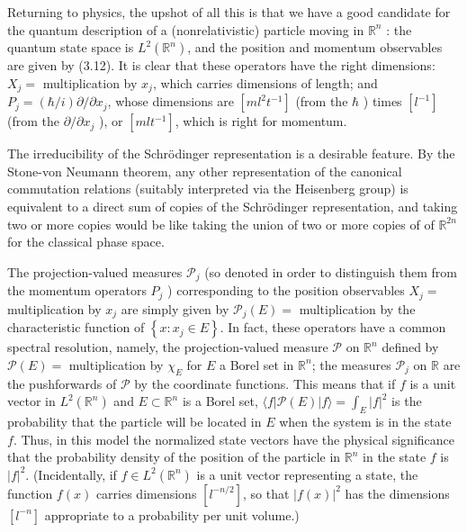 \documentclass[10pt, letterpaper]{article}
\begin{document}
Returning to physics, the upshot of all this is that we have a good candidate for the quantum description of a (nonrelativistic) particle moving in $\mathbb{R}^{n}$ : the quantum state space is $L^{2}\left(\mathbb{R}^{n}\right)$, and the position and momentum observables are given by (3.12). It is clear that these operators have the right dimensions: $X_{j}=$ multiplication by $x_{j}$, which carries dimensions of length; and $P_{j}=(\hbar / i) \partial / \partial x_{j}$, whose dimensions are $\left[m l^{2} t^{-1}\right]$ (from the $\hbar$ ) times $\left[l^{-1}\right]$ (from the $\partial / \partial x_{j}$ ), or $\left[m l t^{-1}\right]$, which is right for momentum.

The irreducibility of the Schrödinger representation is a desirable feature. By the Stone-von Neumann theorem, any other representation of the canonical commutation relations (suitably interpreted via the Heisenberg group) is equivalent to a direct sum of copies of the Schrödinger representation, and taking two or more copies would be like taking the union of two or more copies of of $\mathbb{R}^{2 n}$ for the classical phase space.

The projection-valued measures $\mathcal{P}_{j}$ (so denoted in order to distinguish them from the momentum operators $P_{j}$ ) corresponding to the position observables $X_{j} =$ multiplication by $x_{j}$ are simply given by $\mathcal{P}_{j}(E)=$ multiplication by the characteristic function of $\left\{x: x_{j} \in E\right\}$. In fact, these operators have a common spectral resolution, namely, the projection-valued measure $\mathcal{P}$ on $\mathbb{R}^{n}$ defined by $\mathcal{P}(E)=$ multiplication by $\chi_{E}$ for $E$ a Borel set in $\mathbb{R}^{n}$; the measures $\mathcal{P}_{j}$ on $\mathbb{R}$ are the pushforwards of $\mathcal{P}$ by the coordinate functions. This means that if $f$ is a unit vector in $L^{2}\left(\mathbb{R}^{n}\right)$ and $E \subset \mathbb{R}^{n}$ is a Borel set, $\langle f| \mathcal{P}(E)|f\rangle=\int_{E}|f|^{2}$ is the probability that the particle will be located in $E$ when the system is in the state $f$. Thus, in this model the normalized state vectors have the physical significance that the probability density of the position of the particle in $\mathbb{R}^{n}$ in the state $f$ is $|f|^{2}$. (Incidentally, if $f \in L^{2}\left(\mathbb{R}^{n}\right)$ is a unit vector representing a state, the function $f(x)$ carries dimensions $\left[l^{-n / 2}\right]$, so that $|f(x)|^{2}$ has the dimensions $\left[l^{-n}\right]$ appropriate to a probability per unit volume.)
\end{document}
